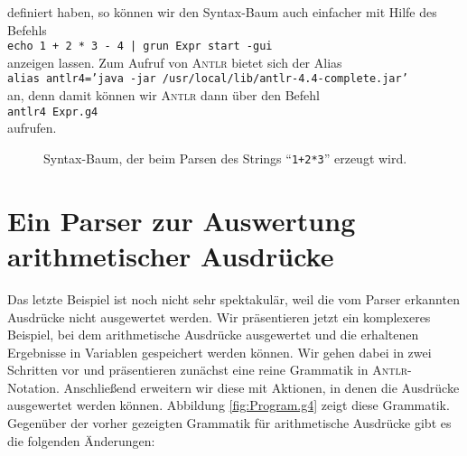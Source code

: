 definiert haben, so k\"onnen wir den Syntax-Baum auch einfacher mit Hilfe des Befehls
\\[0.2cm]
\hspace*{1.3cm}
\texttt{echo 1 + 2 * 3 - 4 | grun Expr start -gui}
\\[0.2cm]
anzeigen lassen.  Zum Aufruf von \textsc{Antlr} bietet sich der Alias
\\[0.2cm]
\hspace*{1.3cm}
\texttt{alias antlr4='java -jar /usr/local/lib/antlr-4.4-complete.jar'}
\\[0.2cm]
an, denn damit k\"onnen wir \textsc{Antlr}  dann \"uber den Befehl
\\[0.2cm]
\hspace*{1.3cm}
\texttt{antlr4 Expr.g4}
\\[0.2cm]
aufrufen.

\begin{figure}[!ht]
  \centering
   \caption{Syntax-Baum, der beim Parsen des Strings ``\texttt{1+2*3}'' erzeugt wird.}
  \label{fig:expr.eps}
\end{figure}



\section{Ein Parser zur Auswertung arithmetischer Ausdr\"ucke}
Das letzte Beispiel ist noch nicht sehr spektakul\"ar, weil die vom Parser erkannten
Ausdr\"ucke nicht ausgewertet werden.  Wir pr\"asentieren jetzt ein komplexeres Beispiel, bei
dem arithmetische Ausdr\"ucke ausgewertet und die erhaltenen Ergebnisse in Variablen
gespeichert werden k\"onnen.  Wir gehen dabei in zwei Schritten vor und pr\"asentieren
zun\"achst eine reine Grammatik in \textsc{Antlr}-Notation.  Anschlie{\ss}end erweitern wir diese
mit Aktionen, in denen die Ausdr\"ucke ausgewertet werden k\"onnen.
Abbildung \ref{fig:Program.g4} zeigt diese Grammatik.  Gegen\"uber der vorher gezeigten
Grammatik f\"ur arithmetische Ausdr\"ucke gibt es die folgenden \"Anderungen:

